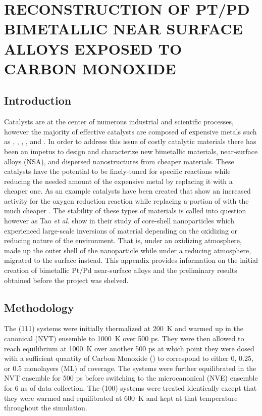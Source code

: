 
\chapter{RECONSTRUCTION OF PT/PD BIMETALLIC NEAR SURFACE ALLOYS EXPOSED TO CARBON MONOXIDE}

\section{Introduction}


Catalysts are at the center of numerous industrial and scientific processes,
however the majority of effective catalysts are composed of expensive metals
such as , , , , and .  In order to address
this issue of costly catalytic materials there has been an impetus to design
and characterize new bimetallic materials,\citep{Yu:2012by, Han:2015qr}
near-surface alloys (NSA),\citep{Jan-Knudsen:2007fe, Stephens:2011bv} and
dispersed nanostructures\citep{Shibata:2002hh,Kugai:2011rt} from cheaper
materials.  These catalysts have the potential to be finely-tuned for specific
reactions while reducing the needed amount of the expensive metal by replacing
it with a cheaper one. As an example  catalysts have been created
that show an increased activity for the oxygen reduction reaction while
replacing a portion of  with the much cheaper
.\citep{Stamenkovic:2007kk,Tuaev:2013fk} The stability of these types of
materials is called into question however as Tao {\em et al.} show in their
study of  core-shell nanoparticles which experienced large-scale
inversions of material depending on the oxidizing or reducing nature of the
environment.\citep{Tao:2008aa} That is, under an oxidizing atmosphere, 
made up the outer shell of the nanoparticle while under a reducing atmosphere,
 migrated to the surface instead. This appendix provides information on
the initial creation of bimetallic Pt/Pd near-surface alloys and the
preliminary results obtained before the project was shelved.

\section{Methodology}
The (111) systems were initially thermalized at 200~K and warmed up in the
canonical (NVT) ensemble  to 1000~K over 500 ps. They were then allowed to
reach equilibrium at 1000~K over another 500 ps at which point they were dosed
with a sufficient quantity of Carbon Monoxide () to correspond to either
0, 0.25, or 0.5 monolayers (ML) of coverage. The systems were further
equilibrated in the NVT ensemble for 500 ps before switching to the
microcanonical (NVE) ensemble for 6 ns of data collection. The (100) systems
were treated identically except that they were warmed and equilibrated at 600~K
and kept at that temperature throughout the simulation.

